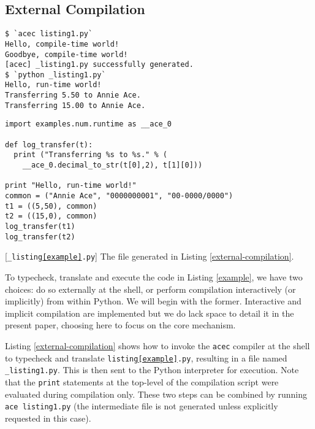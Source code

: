 \documentclass[10pt,preprint]{sigplanconf}
\begin{document}
{\subsection{External Compilation}\label{compilation} 
\begin{codelisting}
\begin{lstlisting}[style=Bash]
$ `acec listing1.py`
Hello, compile-time world!
Goodbye, compile-time world!
[acec] _listing1.py successfully generated.
$ `python _listing1.py`
Hello, run-time world!
Transferring 5.50 to Annie Ace.
Transferring 15.00 to Annie Ace.
\end{lstlisting}
\caption{Compiling \texttt{listing\ref{example}.py} using \texttt{acec}. Both steps can be performed at once by writing \lstinline[style=Bash]{`ace listing1.py`} (line 3 will not be printed with this command).}
\label{external-compilation}
\end{codelisting}
\begin{codelisting}[t]
\begin{lstlisting}
import examples.num.runtime as __ace_0

def log_transfer(t):
  print ("Transferring %s to %s." % (
    __ace_0.decimal_to_str(t[0],2), t[1][0]))

print "Hello, run-time world!"
common = ("Annie Ace", "0000000001", "00-0000/0000")
t1 = ((5,50), common)
t2 = ((15,0), common)
log_transfer(t1)
log_transfer(t2)
\end{lstlisting}
\caption{[\texttt{\_listing\ref{example}.py}] The file generated in Listing \ref{external-compilation}.}
\label{example-out}
\end{codelisting}

To typecheck, translate and execute the code in Listing \ref{example}, we have two choices: do so externally at the shell, or perform compilation interactively (or implicitly) from within Python. We will begin with the former. Interactive and implicit compilation are implemented but we do lack space to detail it in the present paper, choosing here to focus on the core mechanism.%

Listing \ref{external-compilation} shows how to invoke the \verb|acec| compiler at the shell to typecheck and translate \texttt{listing\ref{example}.py}, resulting in a file named \verb|_listing1.py|. This is then sent to the  Python interpreter for execution. Note that the {\texttt{print}} statements at the top-level of the  compilation script were evaluated during compilation only. These two steps can be combined by running \verb|ace listing1.py| (the intermediate file is not generated unless explicitly requested in this case).

}
\end{document}

